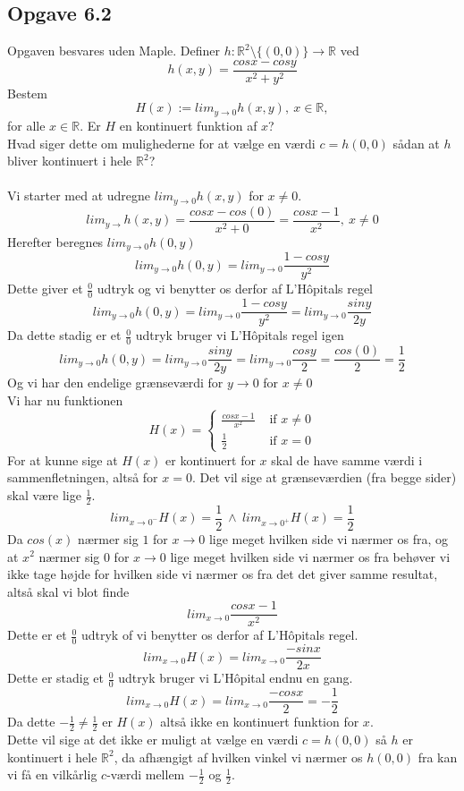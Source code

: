 \documentclass[12pt]{article}
\begin{document}
\subsection*{Opgave 6.2}
Opgaven besvares uden Maple. Definer $h:\mathbb{R}^2\setminus\{(0,0)\}\rightarrow\mathbb{R}$ ved
$$h(x,y)=\frac{cosx-cosy}{x^2+y^2}$$
Bestem
$$H(x):=lim_{y\rightarrow0}h(x,y),\:x\in \mathbb{R},$$
for alle $x\in \mathbb{R}$. Er $H$ en kontinuert funktion af $x$?\\
Hvad siger dette om mulighederne for at vælge en værdi $c=h(0,0)$ sådan at $h$ bliver kontinuert i hele $\mathbb{R}^2$?\\
\\
Vi starter med at udregne $lim_{y\rightarrow0}h(x,y)$ for $x\neq0$.
$$lim_{y\rightarrow}h(x,y)=\frac{cosx-cos(0)}{x^2+0}=\frac{cosx-1}{x^2},\:x\neq0$$
Herefter beregnes $lim_{y\rightarrow0}h(0,y)$
$$lim_{y\rightarrow0}h(0,y)=lim_{y\rightarrow0}\frac{1-cosy}{y^2}$$
Dette giver et $\frac{0}{0}$ udtryk og vi benytter os derfor af L'Hôpitals regel
$$lim_{y\rightarrow0}h(0,y)=lim_{y\rightarrow0}\frac{1-cosy}{y^2}=lim_{y\rightarrow0}\frac{siny}{2y}$$
Da dette stadig er et $\frac{0}{0}$ udtryk bruger vi L'Hôpitals regel igen
$$lim_{y\rightarrow0}h(0,y)=lim_{y\rightarrow0}\frac{siny}{2y}=lim_{y\rightarrow0}\frac{cosy}{2}=\frac{cos(0)}{2}=\frac{1}{2}$$
Og vi har den endelige grænseværdi for $y\rightarrow0$ for $x\neq0$\\
Vi har nu funktionen
$$
H(x) = \left\{ \begin{array}{rl}
{\frac{cosx-1}{x^2}} &\mbox{ if $x\neq0$} \\
\frac{1}{2} &\mbox{ if $x=0$}
\end{array} \right.
$$
For at kunne sige at $H(x)$ er kontinuert for $x$ skal de have samme værdi i sammenfletningen, altså for $x=0$. Det vil sige at grænseværdien (fra begge sider) skal være lige $\frac{1}{2}$.
$$lim_{x\rightarrow0^-}H(x)=\frac{1}{2}\:\wedge\:lim_{x\rightarrow0^+}H(x)=\frac{1}{2}$$
Da $cos(x)$ nærmer sig $1$ for $x\rightarrow0$ lige meget hvilken side vi nærmer os fra, og at $x^2$ nærmer sig $0$ for $x\rightarrow0$ lige meget hvilken side vi nærmer os fra behøver vi ikke tage højde for hvilken side vi nærmer os fra det det giver samme resultat, altså skal vi blot finde
$$lim_{x\rightarrow0}\frac{cosx-1}{x^2}$$
Dette er et $\frac{0}{0}$ udtryk of vi benytter os derfor af L'Hôpitals regel.
$$lim_{x\rightarrow0}H(x)=lim_{x\rightarrow0}\frac{-sinx}{2x}$$
Dette er stadig et $\frac{0}{0}$ udtryk bruger vi L'Hôpital endnu en gang.
$$lim_{x\rightarrow0}H(x)=lim_{x\rightarrow0}\frac{-cosx}{2}=-\frac{1}{2}$$
Da dette $-\frac{1}{2}\neq\frac{1}{2}$ er $H(x)$ altså ikke en kontinuert funktion for $x$.\\
Dette vil sige at det ikke er muligt at vælge en værdi $c=h(0,0)$ så $h$ er kontinuert i hele $\mathbb{R}^2$, da afhængigt af hvilken vinkel vi nærmer os $h(0,0)$ fra kan vi få en vilkårlig $c$-værdi mellem $-\frac{1}{2}$ og $\frac{1}{2}$.
\end{document}
